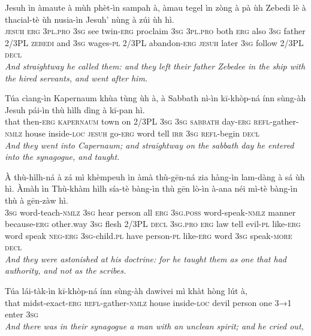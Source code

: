\documentclass[11pt,a4paper]{article}
\begin{document}
\begin{exe}
\gll Jesuh ìn àmaute à mùh phèt-ìn sampah à, àmau tegel ìn zòng à pà ùh Zebedi lè à thacial-tè ùh nusia-ìn Jesuh' nùng à zúi ùh hì. \\
     \textsc{jesuh} \textsc{erg} \textsc{3pl}.\textsc{pro} \textsc{3sg} see twin-\textsc{erg} proclaim \textsc{3sg} \textsc{3pl}.\textsc{pro} both \textsc{erg} also \textsc{3sg} father 2/3PL \textsc{zebedi} and \textsc{3sg} wages-\textsc{pl} 2/3PL abandon-\textsc{erg} \textsc{jesuh} later \textsc{3sg} follow 2/3PL \textsc{decl} \\
\glt \textcolor{kjvcolor}{\textit{And straightway he called them: and they left their father Zebedee in the ship with the hired servants, and went after him.}}

\gll Túa cìang-ìn Kapernaum khùa tùng ùh à, à Sabbath nì-ìn kī-khòp-ná ínn sùng-àh Jesuh pái-ìn thù hìlh dìng à kī-pan hì. \\
     that then-\textsc{erg} \textsc{kapernaum} town on 2/3PL \textsc{3sg} \textsc{3sg} \textsc{sabbath} day-\textsc{erg} \textsc{refl}-gather-\textsc{nmlz} house inside-\textsc{loc} \textsc{jesuh} go-\textsc{erg} word tell \textsc{irr} \textsc{3sg} \textsc{refl}-begin \textsc{decl} \\
\glt \textcolor{kjvcolor}{\textit{And they went into Capernaum; and straightway on the sabbath day he entered into the synagogue, and taught.}}

\gll À thù-hìlh-ná à zá mì khèmpeuh ìn àmà thù-gēn-ná zia hàng-ìn lam-dàng à sá ùh hì. Àmàh ìn Thù-khàm hìlh sía-tè bàng-ìn thù gēn lò-ìn à-ana néi mì-tè bàng-ìn thù à gēn-zàw hì. \\
     \textsc{3sg} word-teach-\textsc{nmlz} \textsc{3sg} hear person all \textsc{erg} \textsc{3sg}.\textsc{poss} word-speak-\textsc{nmlz} manner because-\textsc{erg} other.way \textsc{3sg} flesh 2/3PL \textsc{decl} \textsc{3sg}.\textsc{pro} \textsc{erg} law tell evil-\textsc{pl} like-\textsc{erg} word speak \textsc{neg}-\textsc{erg} \textsc{3sg}-child.\textsc{pl} have person-\textsc{pl} like-\textsc{erg} word \textsc{3sg} speak-\textsc{more} \textsc{decl} \\
\glt \textcolor{kjvcolor}{\textit{And they were astonished at his doctrine: for he taught them as one that had authority, and not as the scribes.}}

\gll Túa lái-tàk-ìn kī-khòp-ná ínn sùng-àh dawivei mì khàt hòng lút à, \\
     that midst-exact-\textsc{erg} \textsc{refl}-gather-\textsc{nmlz} house inside-\textsc{loc} devil person one \textsc{3→1} enter \textsc{3sg} \\
\glt \textcolor{kjvcolor}{\textit{And there was in their synagogue a man with an unclean spirit; and he cried out,}}


\end{exe}
\end{document}
